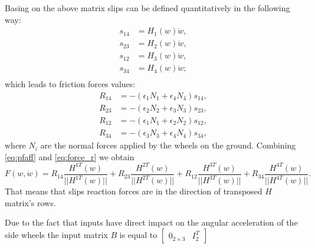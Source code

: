 Basing on the above matrix slips can be defined quantitatively in the following way: 
\begin{align*}
s_{14} &= H_1(w)\dot w,\\
s_{23} &= H_2(w)\dot w,\\
s_{12} &= H_3(w)\dot w,\\
s_{34} &= H_4(w)\dot w;\\
\end{align*}
which leads to friction forces values:
\begin{align}
\label{eq:force_r}
R_{14}&=-(\epsilon_1 N_1 + \epsilon_4 N_4)s_{14},\\
R_{23}&=-(\epsilon_2 N_2 + \epsilon_3 N_3)s_{23},\\
R_{12}&=-(\epsilon_1 N_1 + \epsilon_2 N_2)s_{12},\\
R_{34}&=-(\epsilon_3 N_3 + \epsilon_4 N_4)s_{34},
\end{align}
where $N_i$ are the normal forces applied by the wheels on the ground.
Combining \eqref{eq:pfaff} and \eqref{eq:force_r} we obtain
\begin{equation*}
F(w, \dot{w}) = R_{14}\frac{H^{1T}(w)}{||H^{1T}(w)||} + R_{23}\frac{H^{2T}(w)}{||H^{2T}(w)||} + R_{12}\frac{H^{3T}(w)}{||H^{3T}(w)||} + R_{34}\frac{H^{4T}(w)}{||H^{4T}(w)||}.
\end{equation*}
That means that slips reaction forces are in the direction of transposed $H$ matrix's rows.

Due to the fact that inputs have direct impact on the angular acceleration of the side wheels the input matrix $B$ is equal to $\begin{bmatrix}
0_{2 \times 3} & I_2^T
\end{bmatrix}$ 

